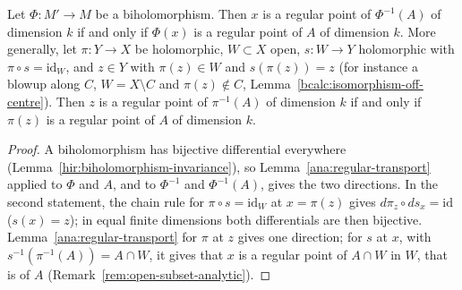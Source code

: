 \begin{lemma}
\label{bcalc:regular-point-transport}
\leanok
Let \(\Phi\colon M'\to M\) be a biholomorphism. Then \(x\) is a regular point of \(\Phi^{-1}(A)\) of dimension \(k\) if and only if \(\Phi(x)\) is a regular point
of \(A\) of dimension \(k\). More generally, let \(\pi\colon Y\to X\) be holomorphic, \(W\subset X\) open, \(s\colon W\to Y\) holomorphic with \(\pi\circ s=\mathrm{id}_W\),
and \(z\in Y\) with \(\pi(z)\in W\) and \(s(\pi(z))=z\) (for instance a blowup along \(C\), \(W=X\setminus C\) and \(\pi(z)\notin C\),
Lemma~\ref{bcalc:isomorphism-off-centre}). Then \(z\) is a regular point of \(\pi^{-1}(A)\) of dimension \(k\) if and only if \(\pi(z)\) is a regular point of \(A\)
of dimension \(k\).
\end{lemma}
\begin{proof}
\leanok
A biholomorphism has bijective differential everywhere (Lemma~\ref{hir:biholomorphism-invariance}), so Lemma~\ref{ana:regular-transport} applied to \(\Phi\) and
\(A\), and to \(\Phi^{-1}\) and \(\Phi^{-1}(A)\), gives the two directions. In the second statement, the chain rule for \(\pi\circ s=\mathrm{id}_W\) at
\(x=\pi(z)\) gives \(d\pi_z\circ ds_x=\mathrm{id}\) (\(s(x)=z\)); in equal finite dimensions both differentials are then bijective. Lemma~\ref{ana:regular-transport}
for \(\pi\) at \(z\) gives one direction; for \(s\) at \(x\), with \(s^{-1}(\pi^{-1}(A))=A\cap W\), it gives that \(x\) is a regular point of \(A\cap W\) in \(W\), that is
of \(A\) (Remark~\ref{rem:open-subset-analytic}).
\end{proof}

